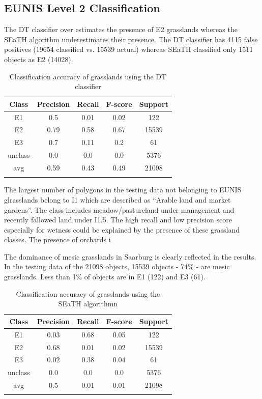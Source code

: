 \documentclass[authoryear, review,12pt,number]{elsarticle}
\begin{document}
{\subsection{EUNIS Level 2 Classification}
\label{level2_classification}
The DT classifier over estimates the presence of E2 grasslands whereas the SEaTH
algorithm underestimates their presence. The DT classifier has 4115 false
positives (19654 classified vs. 15539 actual) whereas SEaTH classified only 1511
objects as E2 (14028). 
\begin{table}
\begin{tabular}{c c c c c}
Class & Precision & Recall & F-score & Support\\
\hline
E1 & 0.5 & 0.01 & 0.02 & 122\\
E2 & 0.79 & 0.58 & 0.67 & 15539\\
E3 & 0.7 & 0.11 & 0.2 & 61\\
unclass & 0.0 & 0.0 & 0.0 & 5376\\
avg & 0.59 & 0.43 & 0.49 & 21098\\
\label{fig:dt_lvl2_classification}
\end{tabular}
\caption{Classification accuracy of grasslands using the DT classifier}
\end{table}
The largest number of polygons in the testing data not belonging to EUNIS
glrasslands belong to I1 which are described as ``Arable land and
market gardens''. The class includes meadow/pastureland under management and
recently fallowed land under I1.5. The high recall and low precision score
especially for wetness could be explained by the presence of these grassland
classes. The presence of orchards i 

The dominance of mesic grasslands in Saarburg is clearly reflected in
the results. In the testing data of the 21098 objects, 15539 objects - 74\% -
are mesic grasslands. Less than 1\% of objects are in E1 (122) and E3 (61). 
\begin{table}
\begin{tabular}{c c c c c}
Class & Precision & Recall & F-score & Support\\
\hline
E1 & 0.03 & 0.68 & 0.05 & 122\\
E2 & 0.68 & 0.01 & 0.02 & 15539\\
E3 & 0.02 & 0.38 & 0.04 & 61\\
unclass & 0.0 & 0.0 & 0.0 & 5376\\
avg & 0.5 & 0.01 & 0.01 & 21098\\
\label{fig:seath_lvl2_classification}
\end{tabular}
\caption{Classification accuracy of grasslands using the SEaTH algorithmn}
\end{table}

}
\end{document}
